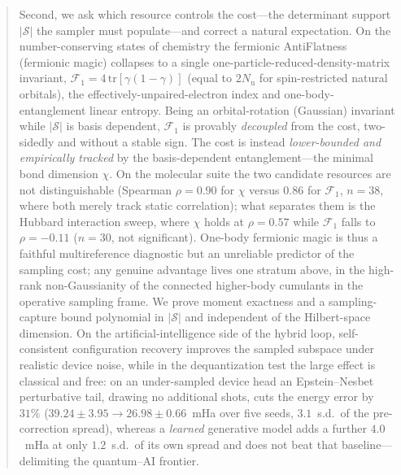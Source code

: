 \documentclass[11pt]{article}
\begin{document}
\begin{abstract}
Second, we ask which resource controls the cost---the determinant support $|\mathcal S|$ the sampler
must populate---and correct a natural expectation. On the number-conserving states of chemistry the
fermionic AntiFlatness (fermionic magic) collapses to a single one-particle-reduced-density-matrix
invariant, $\mathcal F_1=4\,\mathrm{tr}[\gamma(1-\gamma)]$ (equal to $2N_{\mathrm u}$ for
spin-restricted natural orbitals), the effectively-unpaired-electron index and one-body-entanglement
linear entropy. Being an orbital-rotation (Gaussian) invariant while $|\mathcal S|$ is basis dependent,
$\mathcal F_1$ is provably \emph{decoupled} from the cost, two-sidedly and without a stable sign. The
cost is instead \emph{lower-bounded and empirically tracked} by the basis-dependent entanglement---the
minimal bond dimension $\chi$. On the molecular suite the two candidate resources are not distinguishable
(Spearman $\rho=0.90$ for $\chi$ versus $0.86$ for $\mathcal F_1$, $n=38$, where both merely track static
correlation); what separates them is the Hubbard interaction sweep, where $\chi$ holds at $\rho=0.57$
while $\mathcal F_1$ falls to $\rho=-0.11$ ($n=30$, not significant). One-body fermionic magic is thus a
faithful multireference diagnostic but an unreliable predictor of the sampling cost; any genuine
advantage lives one stratum above, in the high-rank non-Gaussianity of the connected higher-body
cumulants in the operative sampling frame. We prove moment exactness and a sampling-capture bound
polynomial in $|\mathcal S|$ and independent of the Hilbert-space dimension. On the
artificial-intelligence side of the hybrid loop, self-consistent configuration recovery improves the
sampled subspace under realistic device noise, while in the dequantization test the large effect is
classical and free: on an under-sampled device head an Epstein--Nesbet perturbative tail, drawing no
additional shots, cuts the
energy error by $31\%$ ($39.24\pm3.95\to26.98\pm0.66$~mHa over five seeds, $3.1$~s.d.\ of the
pre-correction spread), whereas a \emph{learned} generative model adds a further $4.0$~mHa at only
$1.2$~s.d.\ of its own spread and does not beat that baseline---delimiting the quantum--AI frontier.
\end{abstract}










\appendix


\FloatBarrier  %

\end{document}
